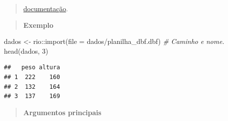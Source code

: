\documentclass[
]{book}
\newenvironment{Shaded}{\begin{snugshade}}{\end{snugshade}}
\newcommand{\AttributeTok}[1]{\textcolor[rgb]{0.77,0.63,0.00}{#1}}
\newcommand{\CommentTok}[1]{\textcolor[rgb]{0.56,0.35,0.01}{\textit{#1}}}
\newcommand{\DecValTok}[1]{\textcolor[rgb]{0.00,0.00,0.81}{#1}}
\newcommand{\FunctionTok}[1]{\textcolor[rgb]{0.00,0.00,0.00}{#1}}
\newcommand{\NormalTok}[1]{#1}
\newcommand{\OtherTok}[1]{\textcolor[rgb]{0.56,0.35,0.01}{#1}}
\newcommand{\SpecialCharTok}[1]{\textcolor[rgb]{0.00,0.00,0.00}{#1}}
\newcommand{\StringTok}[1]{\textcolor[rgb]{0.31,0.60,0.02}{#1}}
\theoremstyle{definition}
\theoremstyle{definition}
\theoremstyle{definition}
\theoremstyle{definition}
\theoremstyle{remark}
\begin{document}
\begin{quote}
\href{https://www.rdocumentation.org/packages/rio/versions/0.5.29/topics/import}{documentação}.
\end{quote}

\begin{quote}
\textbf{Exemplo}
\end{quote}

\begin{Shaded}
\begin{Highlighting}[]
\NormalTok{dados }\OtherTok{\textless{}{-}}\NormalTok{ rio}\SpecialCharTok{::}\FunctionTok{import}\NormalTok{(}\AttributeTok{file =} \StringTok{\textquotesingle{}dados/planilha\_dbf.dbf\textquotesingle{}}\NormalTok{) }\CommentTok{\# Caminho e nome.}
\FunctionTok{head}\NormalTok{(dados, }\DecValTok{3}\NormalTok{)}
\end{Highlighting}
\end{Shaded}

\begin{verbatim}
##   peso altura
## 1  222    160
## 2  132    164
## 3  137    169
\end{verbatim}

\begin{quote}
\textbf{Argumentos principais}
\end{quote}
\end{document}
